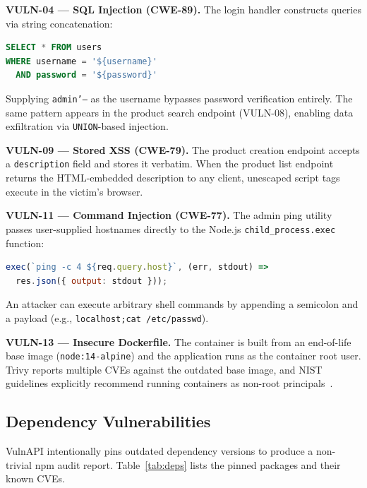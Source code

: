 \documentclass[10pt,conference]{IEEEtran}
\begin{document}
\textbf{VULN-04 — SQL Injection (CWE-89).}
The login handler constructs queries via string concatenation:
\begin{lstlisting}[language=SQL,caption=Vulnerable login query]
SELECT * FROM users
WHERE username = '${username}'
  AND password = '${password}'
\end{lstlisting}
Supplying \texttt{admin'--} as the username bypasses password verification
entirely.
The same pattern appears in the product search endpoint (VULN-08), enabling
data exfiltration via \texttt{UNION}-based injection.

\textbf{VULN-09 — Stored XSS (CWE-79).}
The product creation endpoint accepts a \texttt{description} field and
stores it verbatim.
When the product list endpoint returns the HTML-embedded description to any
client, unescaped script tags execute in the victim's browser.

\textbf{VULN-11 — Command Injection (CWE-77).}
The admin ping utility passes user-supplied hostnames directly to the
Node.js \texttt{child\_process.exec} function:
\begin{lstlisting}[language=JavaScript,caption=Vulnerable command execution]
exec(`ping -c 4 ${req.query.host}`, (err, stdout) =>
  res.json({ output: stdout }));
\end{lstlisting}
An attacker can execute arbitrary shell commands by appending a semicolon
and a payload (e.g., \texttt{localhost;cat /etc/passwd}).

\textbf{VULN-13 — Insecure Dockerfile.}
The container is built from an end-of-life base image (\texttt{node:14-alpine})
and the application runs as the container root user.
Trivy reports multiple CVEs against the outdated base image, and NIST
guidelines explicitly recommend running containers as non-root
principals~\cite{nistcontainer}.

\subsection{Dependency Vulnerabilities}

VulnAPI intentionally pins outdated dependency versions to produce a
non-trivial npm audit report.
Table~\ref{tab:deps} lists the pinned packages and their known CVEs.
\end{document}
